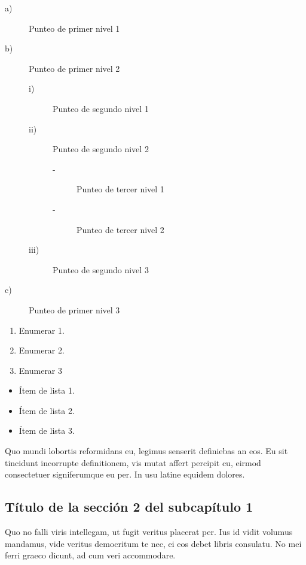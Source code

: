 \documentclass[thesis]{udpbook}
\begin{document}
\begin{description}
\item[a)] Punteo de primer nivel 1
\item[b)] Punteo de primer nivel 2

    \begin{description}
    \item[i)] Punteo de segundo nivel 1
    \item[ii)] Punteo de segundo nivel 2
  
      \begin{description}
      \item[-] Punteo de tercer nivel 1
      \item[-] Punteo de tercer nivel 2
    \end{description}  
    
    \item[iii)] Punteo de segundo nivel 3
  \end{description}

\item[c)] Punteo de primer nivel 3
\end{description}

\begin{enumerate}
\item Enumerar 1.
\item Enumerar 2.
\item Enumerar 3
\end{enumerate}

\begin{itemize}
\item Ítem de lista 1.
\item Ítem de lista 2.
\item Ítem de lista 3.
\end{itemize}


\vspace{0.5cm}
\parindent=30pt Quo mundi lobortis reformidans eu, legimus senserit definiebas an eos. Eu sit tincidunt incorrupte definitionem, vis mutat affert percipit cu, eirmod consectetuer signiferumque eu per. In usu latine equidem dolores.

\subsection{Título de la sección 2 del subcapítulo 1}\label{chsub:Título de la sección 2 del subcapítulo 1}

\parindent=0pt Quo no falli viris intellegam, ut fugit veritus placerat per. Ius id vidit volumus mandamus, vide veritus democritum te nec, ei eos debet libris consulatu. No mei ferri graeco dicunt, ad cum veri accommodare. 
 
\end{document}
